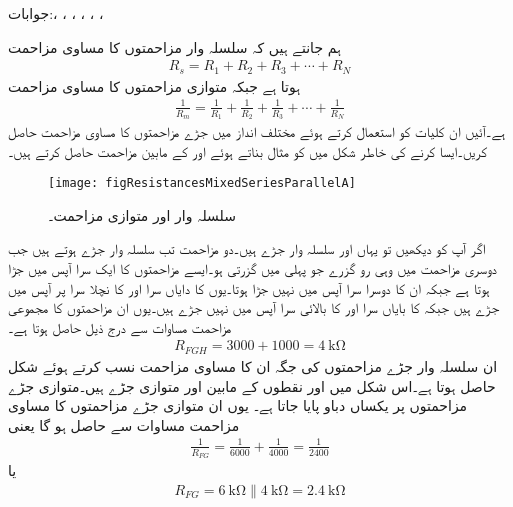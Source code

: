 جوابات:، ، ، ، ، ، 
\FloatBarrier


ہم جانتے ہیں کہ سلسلہ وار مزاحمتوں کا مساوی مزاحمت
\begin{align}\label{مساوات_مزاحمتی_سلسلہ_وار_دوبارہ}
R_s=R_1+R_2+R_3+\cdots+R_N
\end{align}
ہوتا ہے جبکہ متوازی مزاحمتوں کا مساوی مزاحمت
\begin{align}\label{مساوات_مزاحمتی_متوازی_دوبارہ}
\frac{1}{R_m}=\frac{1}{R_1}+\frac{1}{R_2}+\frac{1}{R_3}+\cdots+\frac{1}{R_N}
\end{align}
ہے۔آئیں ان کلیات کو استعمال کرتے ہوئے مختلف انداز میں جڑے مزاحمتوں کا مساوی مزاحمت حاصل کریں۔ایسا کرنے کی خاطر شکل  میں کو مثال بناتے ہوئے  اور  کے مابین مزاحمت  حاصل کرتے ہیں۔
\begin{figure}
\centering
\texttt{[image: figResistancesMixedSeriesParallelA]}
\caption{سلسلہ وار اور متوازی مزاحمت۔}
\label{مشق_مزاحمتی_سلسلہ_وار_متوازی_مزاحمت}
\end{figure}

اگر آپ  کو دیکھیں تو  یہاں  اور  سلسلہ وار جڑے ہیں۔دو مزاحمت تب سلسلہ وار جڑے ہوتے ہیں جب دوسری مزاحمت میں وہی رو گزرے جو پہلی میں گزرتی ہو۔ایسے مزاحمتوں کا ایک سرا آپس میں جڑا ہوتا ہے جبکہ ان کا دوسرا سرا آپس میں نہیں جڑا ہوتا۔یوں  کا دایاں سرا اور  کا نچلا سرا  پر آپس میں جڑے ہیں جبکہ  کا بایاں سرا اور  کا بالائی سرا آپس میں نہیں جڑے ہیں۔یوں ان مزاحمتوں کا مجموعی مزاحمت مساوات  سے درج ذیل حاصل ہوتا ہے۔
\begin{align*}
R_{FGH}=3000+1000=\SI{4}{\kilo\ohm}
\end{align*}
ان سلسلہ وار جڑے مزاحمتوں کی جگہ ان کا مساوی مزاحمت  نسب کرتے ہوئے شکل  حاصل ہوتا ہے۔اس شکل میں  اور  نقطوں کے مابین  اور  متوازی جڑے ہیں۔متوازی جڑے مزاحمتوں پر یکساں دباو پایا جاتا ہے۔ یوں ان متوازی جڑے مزاحمتوں کا مساوی مزاحمت مساوات  سے حاصل ہو گا یعنی 
\begin{align*}
\frac{1}{R_{FG}}=\frac{1}{6000}+\frac{1}{4000}=\frac{1}{2400}
\end{align*}
یا
\begin{align*}
R_{FG}=\SI{6}{\kilo\ohm} \parallel \SI{4}{\kilo\ohm}=\SI{2.4}{\kilo\ohm}
\end{align*}

